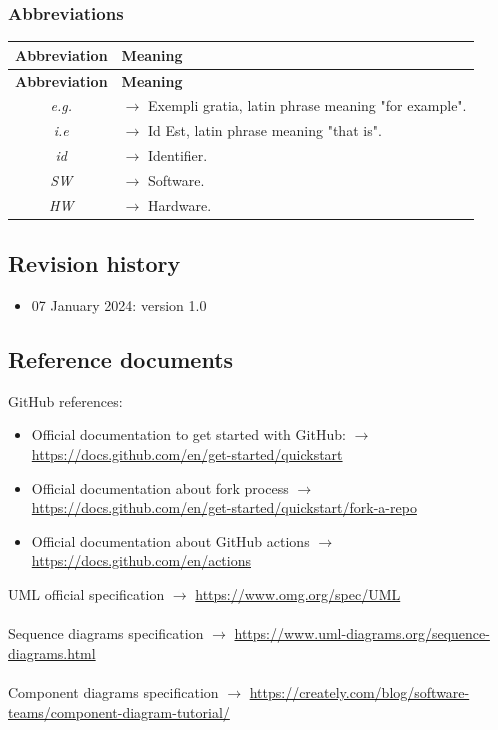 \documentclass{article}
\begin{document}
{\begin{xltabular}{\textwidth}{ >{\raggedright\arraybackslash}c >{\raggedright\arraybackslash}X }
\end{xltabular}

\newpage
\subsubsection{Abbreviations}
\begin{xltabular}{\textwidth}{ >{\raggedright\arraybackslash}c >{\raggedright\arraybackslash}X }
    \hline
    \textbf{Abbreviation} & \textbf{Meaning} \\
    \hline

    \endfirsthead

    \hline
    \textbf{Abbreviation} & \textbf{Meaning} \\
    \hline

    \endhead
    \endfoot
    \endlastfoot

    \textit{e.g.} & $\rightarrow$ Exempli gratia, latin phrase meaning "for example".
    \\
    \textit{i.e} & $\rightarrow$ Id Est, latin phrase meaning "that is".
    \\
    \textit{id} & $\rightarrow$ Identifier.
    \\
    \textit{SW} & $\rightarrow$ Software.
    \\
    \textit{HW} & $\rightarrow$ Hardware.
    \\
\end{xltabular}
\subsection{Revision history}
\begin{itemize}
    \item 07 January 2024: version 1.0
\end{itemize}

\subsection{Reference documents}
GitHub references:
\begin{itemize}
    \item Official documentation to get started with GitHub: $\rightarrow$ \url{https://docs.github.com/en/get-started/quickstart}
    \item Official documentation about fork process $\rightarrow$ \url{https://docs.github.com/en/get-started/quickstart/fork-a-repo}
    \item Official documentation about GitHub actions $\rightarrow$ \url{https://docs.github.com/en/actions}
\end{itemize}
UML official specification $\rightarrow$ \url{https://www.omg.org/spec/UML}
\\ \\
Sequence diagrams specification $\rightarrow$ \url{https://www.uml-diagrams.org/sequence-diagrams.html}
\\ \\
Component diagrams specification $\rightarrow$ \url{https://creately.com/blog/software-teams/component-diagram-tutorial/}

}
\end{document}
